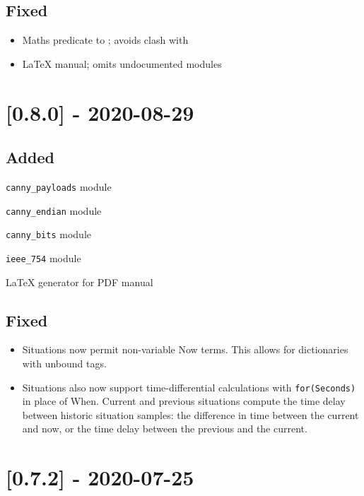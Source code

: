 \subsection{Fixed}

\begin{itemize}
    \item Maths predicate  to ; avoids clash with 
    \item LaTeX manual; omits undocumented modules
\end{itemize}

\section{[0.8.0] - 2020-08-29}

\subsection{Added}

\begin{shortlist}
    \item \verb$canny_payloads$ module
    \item \verb$canny_endian$ module
    \item \verb$canny_bits$ module
    \item \verb$ieee_754$ module
    \item LaTeX generator for PDF manual
\end{shortlist}

\subsection{Fixed}

\begin{itemize}
    \item Situations now permit non-variable Now terms. This allows for dictionaries
with unbound tags.
    \item Situations also now support time-differential calculations with \verb$for(Seconds)$
in place of When. Current and previous situations compute the time delay
between historic situation samples: the difference in time between the current
and now, or the time delay between the previous and the current.
\end{itemize}

\section{[0.7.2] - 2020-07-25}

